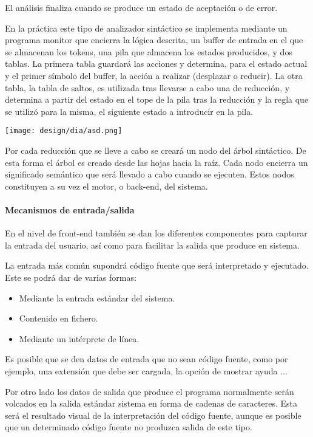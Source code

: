 El análisis finaliza cuando se produce un estado de aceptación o de error. 

En la práctica este tipo de analizador sintáctico se implementa mediante un programa monitor que encierra la lógica descrita, un buffer de entrada en el que se almacenan
los tokens, una pila que almacena los estados producidos, y dos tablas. La primera tabla guardará las acciones y determina, para el estado actual y el primer símbolo del buffer, 
la acción a realizar (desplazar o reducir). La otra tabla, la tabla de saltos, es utilizada tras llevarse a cabo una de reducción, y determina a partir del estado en el tope de la pila
tras la reducción y la regla que se utilizó para la misma, el siguiente estado a introducir en la pila. 

\begin{center}
\texttt{[image: design/dia/asd.png]} 
\end{center}

Por cada reducción que se lleve a cabo se creará un nodo del árbol sintáctico. De esta forma el árbol es creado desde las hojas hacia la raíz. Cada nodo encierra un significado semántico que 
será llevado a cabo cuando se ejecuten. Estos nodos constituyen a su vez el motor, o back-end, del sistema.

\paragraph{Mecanismos de entrada/salida}
En el nivel de front-end también se dan los diferentes componentes para capturar la entrada del usuario, así como para facilitar la salida que produce en sistema.

La entrada más común supondrá código fuente que será interpretado y ejecutado. Este se podrá dar de varias formas:

\begin{itemize}
\item Mediante la entrada estándar del sistema.
\item Contenido en fichero.
\item Mediante un intérprete de línea.
\end{itemize}

Es posible que se den datos de entrada que no sean código fuente, como por ejemplo, una extensión que debe ser cargada, la opción de mostrar ayuda ...

Por otro lado los datos de salida que produce el programa normalmente serán volcados en la salida estándar sistema en forma de cadenas de caracteres. 
Esta será el resultado visual de la interpretación del código fuente, aunque es posible que un determinado código fuente no produzca salida de este tipo. 


